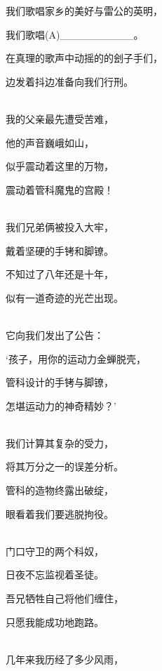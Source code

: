 \documentclass[UTF8,12pt,oneside]{ctexbook}
\begin{document}
\begin{center}
        我们歌唱家乡的美好与雷公的英明，
        
        我们歌唱(A)\_\_\_\_\_\_\_\_\_\_。
        
        在真理的歌声中动摇的的刽子手们，
        
        边发着抖边准备向我们行刑。
      
        ~\\
        
        我的父亲最先遭受苦难，
        
        他的声音巍峨如山，
        
        似乎震动着这里的万物，
        
        震动着管科魔鬼的宫殿！
      
        ~\\
        
        我们兄弟俩被投入大牢，
        
        戴着坚硬的手铐和脚镣。
        
        不知过了八年还是十年，
        
        似有一道奇迹的光芒出现。
      
        ~\\
        
        它向我们发出了公告：
        
        ‘孩子，用你的运动力金蝉脱壳，
        
        管科设计的手铐与脚镣，
        
        怎堪运动力的神奇精妙？’
      
        ~\\
        
        我们计算其复杂的受力，
        
        将其万分之一的误差分析。
        
        管科的造物终露出破绽，
        
        眼看着我们要逃脱拘役。
      
        ~\\
        
        门口守卫的两个科奴，
        
        日夜不忘监视着圣徒。
        
        吾兄牺牲自己将他们缠住，
        
        只愿我能成功地跑路。
      
        ~\\
        
        几年来我历经了多少风雨，
        

\end{center}
\end{document}
